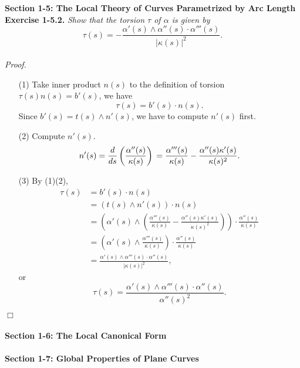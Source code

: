 \documentclass{article}
\begin{document}



\textbf{\large Section 1-5: The Local Theory of Curves Parametrized by Arc Length} \\

\textbf{Exercise 1-5.2.}
\emph{Show that the torsion $\tau$ of $\alpha$ is given by
$$\tau(s) = -\frac{\alpha'(s) \wedge \alpha''(s) \cdot \alpha'''(s)}{|\kappa(s)|^2}.$$} \\

\emph{Proof.}
\begin{enumerate}
\item[(1)]
Take inner product $n(s)$
to the definition of torsion $\tau(s) n(s) = b'(s)$,
we have $$\tau(s) = b'(s) \cdot n(s).$$
Since $b'(s) = t(s) \wedge n'(s)$, we have to compute $n'(s)$ first.
\item[(2)]
Compute $n'(s)$.
$$n'(s)
= \frac{d}{ds} \left( \frac{\alpha''(s)}{\kappa(s)} \right) \\
= \frac{\alpha'''(s)}{\kappa(s)} - \frac{\alpha''(s)\kappa'(s)}{\kappa(s)^2}.$$
\item[(3)]
By (1)(2),
\begin{align*}
\tau(s)
&= b'(s) \cdot n(s) \\
&= (t(s) \wedge n'(s)) \cdot n(s) \\
&= \left(
  \alpha'(s)
    \wedge
  \left(
    \frac{\alpha'''(s)}{\kappa(s)}
    - \frac{\alpha''(s)\kappa'(s)}{\kappa(s)^2}
  \right)
\right)
\cdot \frac{\alpha''(s)}{\kappa(s)} \\
&= \left(
  \alpha'(s) \wedge \frac{\alpha'''(s)}{\kappa(s)}
\right)
\cdot \frac{\alpha''(s)}{\kappa(s)} \\
&= \frac{\alpha'(s) \wedge \alpha'''(s) \cdot \alpha''(s)}{|\kappa(s)|^2},
\end{align*}
or
$$\tau(s) = \frac{\alpha'(s) \wedge \alpha'''(s) \cdot \alpha''(s)}{\alpha''(s)^2}.$$

\end{enumerate}
$\Box$ \\\\






\textbf{\large Section 1-6: The Local Canonical Form} \\\\






\textbf{\large Section 1-7: Global Properties of Plane Curves} \\\\



\end{document}
